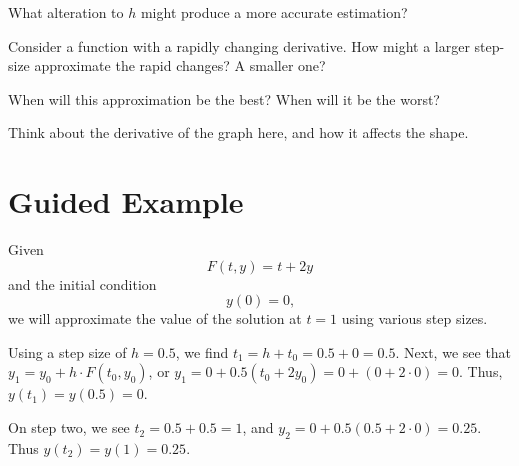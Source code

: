 \documentclass{ximera}
\begin{document}
\begin{question}
What alteration to $h$ might produce a more accurate estimation?
\begin{multipleChoice}
\end{multipleChoice}
\begin{hint}
Consider a function with a rapidly changing derivative. How might a larger step-size approximate the rapid changes? A smaller one?
\end{hint}

When will this approximation be the best? When will it be the worst?
\begin{foldable}{0}
\begin{multipleChoice}
\end{multipleChoice}
\end{foldable}
\begin{hint}
Think about the derivative of the graph here, and how it affects the shape.
\end{hint}
\end{question}

\section{Guided Example}
Given $$F(t,y) = t + 2y$$ and the initial condition $$y(0) = 0\text{,}$$ we will approximate the value of the solution at $t = 1$ using various step sizes.

Using a step size of $h = 0.5$, we find $t_1 = h + t_0  = 0.5 + 0 = 0.5$. Next, we see that $y_1 = y_0 + h \cdot F(t_0, y_0)$, or $y_1 = 0 + 0.5(t_0+2y_0) = 0+(0+2\cdot 0) = 0$. Thus, $y(t_1) = y(0.5)= 0$.

On step two, we see $t_2 = 0.5 + 0.5 = 1$, and $y_2 = 0 + 0.5(0.5 + 2\cdot 0) = 0.25$. Thus $y(t_2) = y(1) = 0.25$.
\end{document}
